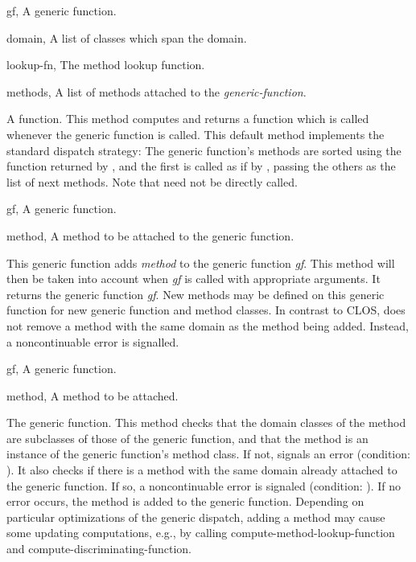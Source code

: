 \begin{optDefinition}
%
\begin{specargs}
    \item[gf, \classref{generic-function}] A generic function.
    \item[domain, \classref{list}] A list of classes which span the domain.
    \item[lookup-fn, \classref{function}] The method lookup function.
    \item[methods, \classref{list}] A list of methods attached to the {\em
        generic-function}.
\end{specargs}
%
\result%
A function.
%
\remarks%
This method computes and returns a function which is called whenever
the generic function is called.  This default method implements the
standard dispatch strategy:  The generic function's methods are sorted
using the function returned by ,
and the first is called as if by , passing the others
as the list of next methods.  Note that  need not be
directly called.

%
\begin{genericargs}
    \item[gf, \classref{generic-function}] A generic function.
    \item[method, \classref{method}] A method to be attached to the generic
    function.
\end{genericargs}
%
\result%
This generic function adds {\em method} to the generic function {\em
gf}.  This method will then be taken into account when {\em gf} is
called with appropriate arguments.  It returns the generic function
{\em gf}.  New methods may be defined on this generic function for new
generic function and method classes.
%
\remarks%
In contrast to CLOS,  does not remove a method with
the same domain as the method being added. Instead, a noncontinuable
error is signalled.

%
\begin{specargs}
    \item[gf, \classref{generic-function}] A generic function.
    \item[method, \classref{method}] A method to be attached.
\end{specargs}
%
\result%
The generic function.
%
\remarks%
This method checks that the domain classes of the method are subclasses of those
of the generic function, and that the method is an instance of the generic
function's method class.  If not, signals an error (condition:
).  It also checks if there is a
method with the same domain already attached to the generic function.  If so, a
noncontinuable error is signaled (condition:
). If no error
occurs, the method is added to the generic function.  Depending on particular
optimizations of the generic dispatch, adding a method may cause some updating
computations, e.g., by calling compute-method-lookup-function and
compute-discriminating-function.
%
\end{optDefinition}
